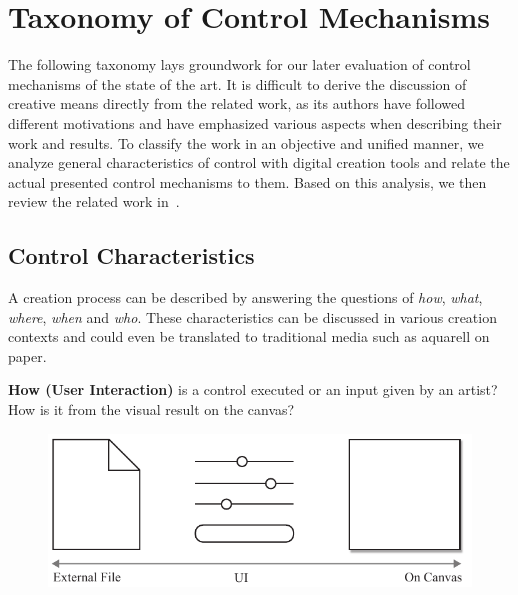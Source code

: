 

\section{Taxonomy of Control Mechanisms}\label{sec:taxo_control_mechanism}

The following taxonomy lays groundwork for our later evaluation of control mechanisms of the state of the art. It is difficult to derive the discussion of creative means directly from the related work, as its authors have followed different motivations and have emphasized various aspects when describing their work and results. To classify the work in an objective and unified manner, we analyze general characteristics of control with digital creation tools and relate the actual presented control mechanisms to them. Based on this analysis, we then review the related work in~.

\newcommand{\controlParamsFigWidth}{0.9}

\subsection{Control Characteristics}\label{control_charateristics}
A creation process can be described by answering the questions of \textit{how}, \textit{what}, \textit{where}, \textit{when} and \textit{who}. These characteristics can be discussed in various creation contexts and could even be translated to traditional media such as aquarell on paper.

\noindent\textbf{How (User Interaction)} is a control executed or an input given by an artist? How  is it from the visual result on the canvas? 

\begin{figure}[H]
    \centering
        \includegraphics[width=\controlParamsFigWidth\linewidth]{figures/control_paradigms/how.pdf}
\end{figure}

